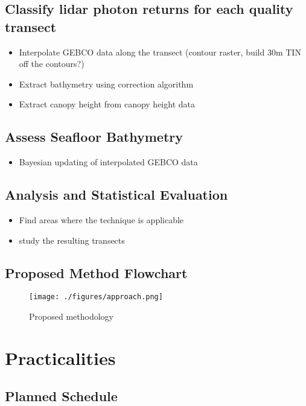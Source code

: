 \section{Classify lidar photon returns for each quality  transect}

\begin{itemize}
      \item Interpolate GEBCO data along the transect (contour raster, build 30m TIN off the contours?)
      \item Extract bathymetry using correction algorithm
      \item Extract canopy height from canopy height data
\end{itemize}


\section{Assess Seafloor Bathymetry}

\begin{itemize}
      \item Bayesian updating of interpolated GEBCO data
\end{itemize}

\section{Analysis and Statistical Evaluation}

\begin{itemize}
      \item Find areas where the technique is applicable
      \item study the resulting transects
\end{itemize}

\section{Proposed Method Flowchart}

\begin{figure}
      \centering
      \texttt{[image: ./figures/approach.png]}
      \caption{Proposed methodology}
      \label{method-flowchart}
\end{figure}

\chapter{Practicalities}

\section{Planned Schedule}

